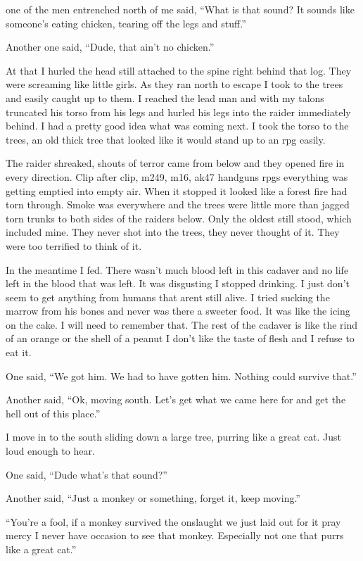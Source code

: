 one of the men entrenched north of me said, ``What is that sound? It sounds like someone's eating chicken, tearing off the legs and stuff.''

Another one said, ``Dude, that ain't no chicken.''

At that I hurled the head still attached to the spine right behind that log. They were screaming like little girls. As they ran north to escape I took to the trees and easily caught up to them. I reached the lead man and with my talons truncated his torso from his legs and hurled his legs into the raider immediately behind. I had a pretty good idea what was coming next. I took the torso to the trees, an old thick tree that looked like it would stand up to an rpg easily. 

The raider shreaked, shouts of terror came from below and they opened fire in every direction. Clip after clip, m249, m16, ak47 handguns rpgs everything was getting emptied into empty air. When it stopped it looked like a forest fire had torn through. Smoke was everywhere and the trees were little more than jagged torn trunks to both sides of the raiders below. Only the oldest still stood, which included mine. They never shot into the trees, they never thought of it. They were too terrified to think of it.

In the meantime I fed. There wasn't much blood left in this cadaver and no life left in the blood that was left. It was disgusting I stopped drinking. I just don't seem to get anything from humans that arent still alive. I tried sucking the marrow from his bones and never was there a sweeter food. It was like the icing on the cake. I will need to remember that. The rest of the cadaver is like the rind of an orange or the shell of a peanut I don't like the taste of flesh and I refuse to eat it.

One said, ``We got him. We had to have gotten him. Nothing could survive that.''

Another said, ``Ok, moving south. Let's get what we came here for and get the hell out of this place.''

I move in to the south sliding down a large tree, purring like a great cat. Just loud enough to hear.

One said, ``Dude what's that sound?''

Another said, ``Just a monkey or something, forget it, keep moving.''

``You're a fool, if a monkey survived the onslaught we just laid out for it pray mercy I never have occasion to see that monkey. Especially not one that purrs like a great cat.''


